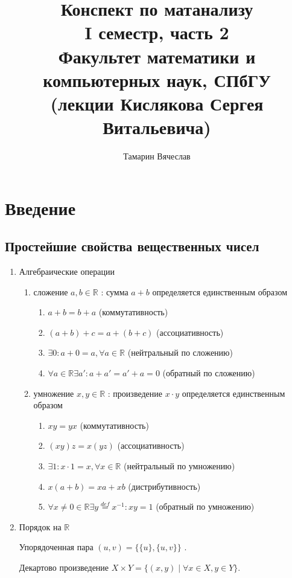 \documentclass[11pt]{book}
\title{Конспект по матанализу\\I семестр, часть 2\\
    Факультет математики и компьютерных наук, СПбГУ\\
(лекции Кислякова Сергея Витальевича)}
\author{Тамарин Вячеслав}
\newcommand{\R}{\mathbb{R}}
\theoremstyle{definition}
\theoremstyle{plain}
\theoremstyle{plain}
\theoremstyle{definition}
\theoremstyle{remark}
\begin{document}
\maketitle
\tableofcontents


\chapter{Введение}
\section{Простейшие свойства вещественных чисел}
\begin{enumerate}
    \item Алгебраические операции
	\begin{enumerate}
	    \item сложение $a, b \in \R$ : сумма $a+b$ определяется единственным образом
		\begin{enumerate}
		    \item  $a+b = b+a$ (коммутативность)
		    \item  $(a+b)+c = a+(b+c)$ (ассоциативность)
		    \item  $\exists 0: a +0 = a, \forall a \in \R$ (нейтральный по сложению)
		    \item  $\forall a \in \R \exists a': a +a' = a' + a = 0 $ (обратный по сложению)
		\end{enumerate}
	    \item умножение $x,y \in \R$ : произведение $x\cdot y$ определяется единственным образом
		\begin{enumerate}
		    \item  $x y = y x$ (коммутативность)
		    \item  $(xy)z = x(yz)$ (ассоциативность)
		    \item  $\exists 1: x \cdot 1 = x, \forall x \in \R$ (нейтральный по умножению)
		    \item  $x(a+b) =xa + xb$ (дистрибутивность)
		    \item  $\forall x\ne 0 \in \R \exists y  \stackrel{def} = x^{-1}: xy = 1$ (обратный по умножению)
		\end{enumerate}
	\end{enumerate}
    \item Порядок на $\R$
	\begin{defn}
	    Упорядоченная пара $(u, v) = \{\{u\}, \{u, v\}\}$ .
	\end{defn}
	\begin{defn}
	    Декартово произведение $X \times Y = \{(x, y) \mid \forall x \in X, y \in Y\}$.

\end{defn}
\end{enumerate}
\end{document}
